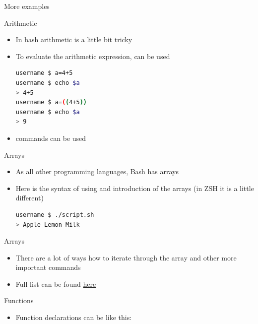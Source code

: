 \documentclass[usenames,dvipsnames,10pt,aspectratio=169]{beamer}
\begin{document}
\begin{frame}{More  examples}
    
\end{frame}

\begin{frame}[fragile]{Arithmetic}
    \begin{itemize}
        \item In bash arithmetic is a little bit tricky
        \item To evaluate the arithmetic expression,  can be used
        \begin{lstlisting}[language=Bash, style=shellstyle]
username $ a=4+5
username $ echo $a
> 4+5
username $ a=((4+5))
username $ echo $a
> 9 \end{lstlisting}
        \item {} commands can be used 
    \end{itemize}
\end{frame}

\begin{frame}[fragile]{Arrays}
    \begin{itemize}
        \item As all other programming languages, Bash has arrays
        \item Here is the syntax of using and introduction of the arrays (in ZSH it is a little different)
        
        \begin{lstlisting}[language=Bash, style=shellstyle]
username $ ./script.sh
> Apple Lemon Milk
        \end{lstlisting}
    \end{itemize}
\end{frame}

\begin{frame}[fragile]{Arrays}
    \begin{itemize}
        \item There are a lot of ways how to iterate through the array and other more important commands
        
        \item Full list can be found \href{https://devhints.io/bash#arrays}{here}
    \end{itemize}
\end{frame}

\begin{frame}[fragile]{Functions}
    \begin{itemize}
        \item Function declarations can be like this:
        
    \end{itemize}
\end{frame}
\end{document}
